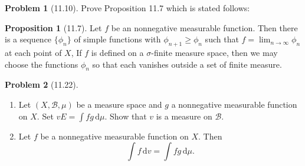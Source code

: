 \documentclass[12pt]{article}
\newcommand{\B}{\mathcal{B}}
\newcommand{\dif}{\, \mathrm{d}}
\theoremstyle{definition}
\newtheorem{problem}{Problem}
\newtheorem*{prop}{Proposition}
\begin{document}
\begin{problem}[11.10]

    Prove Proposition 11.7 which is stated follows:
        \begin{prop}[11.7]
            Let \( f \) be an nonnegative measurable function. 
  Then there is a sequence \( \{\phi_n\} \) of simple functions with \( \phi_{n+1} \geq \phi_n \) such that \( \displaystyle f = \lim_{n \to \infty} \phi_n \) at each point of \( X \), If \( f \) is defined on a  \( \sigma \)-finite measure space, then we may choose the functions \( \phi_n \) so that each vanishes outside a set of finite measure. 
        \end{prop}


\end{problem}

\begin{problem}[11.22]

    \begin{enumerate}[label = (\alph{*})]
        \item Let \( (X, \B, \mu) \) be a measure space and \( g \) a nonnegative measurable function on \( X \). Set \( \displaystyle vE = \int fg \dif \mu \). 
        Show that \( v \) is a measure on \( \B \).
        \item Let \(f \) be a nonnegative measurable function on \( X \). Then 
            \[
                \int f \dif v = \int fg \dif \mu.  
            \]
    \end{enumerate}


\end{problem}
\end{document}
